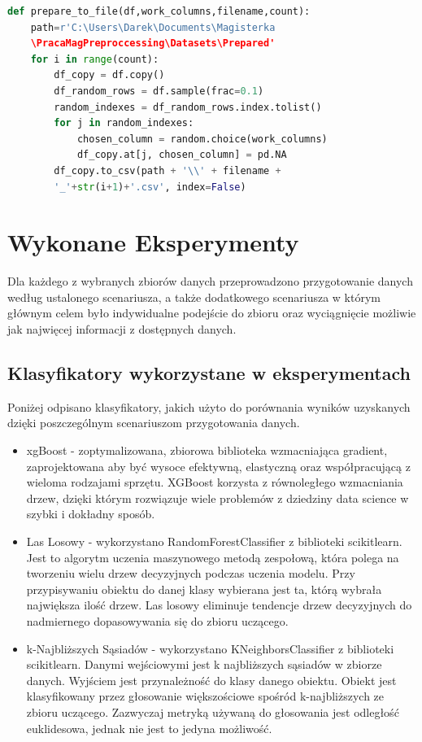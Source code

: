 \documentclass[oneside]{book}
\begin{document}
\begin{lstlisting}[language=Python, caption={Funkcja generująca braki w podanym zbiorze danych}, captionpos=b]
    def prepare_to_file(df,work_columns,filename,count):
    path=r'C:\Users\Darek\Documents\Magisterka
    \PracaMagPreproccessing\Datasets\Prepared'
    for i in range(count):
        df_copy = df.copy()
        df_random_rows = df.sample(frac=0.1)
        random_indexes = df_random_rows.index.tolist()
        for j in random_indexes:
            chosen_column = random.choice(work_columns)
            df_copy.at[j, chosen_column] = pd.NA
        df_copy.to_csv(path + '\\' + filename +
        '_'+str(i+1)+'.csv', index=False)
\end{lstlisting}
\chapter{Wykonane Eksperymenty}
Dla każdego z wybranych zbiorów danych przeprowadzono 
przygotowanie danych według ustalonego scenariusza, 
a także dodatkowego scenariusza w którym głównym celem było 
indywidualne podejście do zbioru oraz wyciągnięcie możliwie 
jak najwięcej informacji z dostępnych danych.


\section{Klasyfikatory wykorzystane w eksperymentach}
Poniżej odpisano klasyfikatory, jakich użyto do porównania wyników uzyskanych
dzięki poszczególnym scenariuszom przygotowania danych.

\begin{itemize}
\item xgBoost - zoptymalizowana, zbiorowa biblioteka wzmacniająca gradient, zaprojektowana aby być wysoce
efektywną, elastyczną oraz współpracującą z wieloma rodzajami sprzętu. XGBoost korzysta z równoległego wzmacniania drzew, 
dzięki którym rozwiązuje wiele problemów z dziedziny data science w szybki
 i dokładny sposób. \cite{xgBoost}

\item Las Losowy -
wykorzystano RandomForestClassifier z biblioteki scikitlearn. 
Jest to algorytm uczenia maszynowego metodą zespołową, 
która polega na tworzeniu wielu drzew decyzyjnych podczas 
uczenia modelu. Przy przypisywaniu obiektu do danej klasy wybierana
jest ta, którą wybrała największa ilość drzew. Las losowy eliminuje 
tendencje drzew decyzyjnych do nadmiernego dopasowywania się do zbioru
uczącego. \cite{random forest}

\item k-Najbliższych Sąsiadów -
wykorzystano KNeighborsClassifier z biblioteki 
scikitlearn. Danymi wejściowymi jest k 
najbliższych sąsiadów w zbiorze danych. Wyjściem 
jest przynależność do klasy danego obiektu. Obiekt 
jest klasyfikowany przez głosowanie większościowe 
spośród k-najbliższych ze zbioru uczącego. Zazwyczaj 
metryką używaną do głosowania jest odległość euklidesowa, 
jednak nie jest to jedyna możliwość. \cite{k-nearest neighbors}
\end{itemize}
\end{document}
